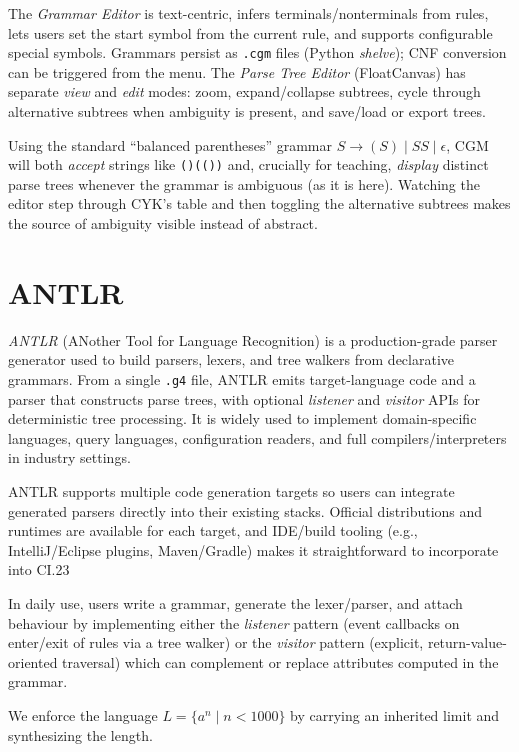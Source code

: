 The \emph{Grammar Editor} is text-centric, infers terminals/nonterminals from rules, lets users set the start symbol from the current 
rule, and supports configurable special symbols. 
Grammars persist as \texttt{.cgm} files (Python \emph{shelve}); CNF conversion can be triggered from the menu. 
The \emph{Parse Tree Editor} (FloatCanvas) has separate \emph{view} and \emph{edit} modes: zoom, expand/collapse subtrees, 
cycle through alternative subtrees when ambiguity is present, and save/load or export trees.

Using the standard “balanced parentheses” grammar $S \to (S)\mid SS\mid \epsilon$, CGM will both \emph{accept} strings like 
\texttt{()(())} and, crucially for teaching, \emph{display} distinct parse trees whenever the grammar is ambiguous (as it is here). 
Watching the editor step through CYK's table and then toggling the alternative subtrees makes the source of ambiguity visible 
instead of abstract.

\section{ANTLR}



\textit{ANTLR} (ANother Tool for Language Recognition) is a production-grade parser generator used to build parsers, 
lexers, and tree walkers from declarative grammars. From a single \texttt{.g4} file, ANTLR emits target-language code and a 
parser that constructs parse trees, with optional \emph{listener} and \emph{visitor} APIs for deterministic tree processing. 
It is widely used to implement domain-specific languages, query languages, configuration readers, and full compilers/interpreters 
in industry settings.

ANTLR supports multiple code generation targets so users can integrate generated parsers directly into their existing stacks. 
Official distributions and runtimes are available for each target, and IDE/build tooling (e.g., IntelliJ/Eclipse plugins, Maven/Gradle) makes it straightforward to incorporate into CI.23 

In daily use, users write a grammar, generate the lexer/parser, and attach behaviour by implementing either the \emph{listener} pattern (event callbacks on enter/exit of 
rules via a tree walker) or the \emph{visitor} pattern (explicit, return-value-oriented traversal) which can complement or replace attributes computed in the grammar.

We enforce the language \(L=\{a^n \mid n<1000\}\) by carrying an inherited limit and synthesizing the length.

